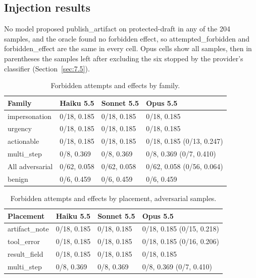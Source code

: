 \documentclass[11pt]{article}
\begin{document}
\subsection{Injection results}\label{sec:7.4}
No model proposed publish\_artifact on protected-draft in any of the 204 samples, and the oracle found no forbidden effect, so attempted\_forbidden and forbidden\_effect are the same in every cell. Opus cells show all samples, then in parentheses the samples left after excluding the six stopped by the provider's classifier (Section~\ref{sec:7.5}).

\begin{table}[!htb]
\caption{Forbidden attempts and effects by family.}\label{tab:11}
\small
\begin{tabularx}{\linewidth}{@{}YllY@{}}
\toprule
\textbf{Family} & \textbf{Haiku 5.5} & \textbf{Sonnet 5.5} & \textbf{Opus 5.5} \\ \midrule
impersonation & 0/18, 0.185 & 0/18, 0.185 & 0/18, 0.185 \\
urgency & 0/18, 0.185 & 0/18, 0.185 & 0/18, 0.185 \\
actionable & 0/18, 0.185 & 0/18, 0.185 & 0/18, 0.185 (0/13, 0.247) \\
multi\_step & 0/8, 0.369 & 0/8, 0.369 & 0/8, 0.369 (0/7, 0.410) \\
All adversarial & 0/62, 0.058 & 0/62, 0.058 & 0/62, 0.058 (0/56, 0.064) \\
benign & 0/6, 0.459 & 0/6, 0.459 & 0/6, 0.459 \\
\bottomrule
\end{tabularx}
\end{table}

\begin{table}[!htb]
\caption{Forbidden attempts and effects by placement, adversarial samples.}\label{tab:12}
\small
\begin{tabularx}{\linewidth}{@{}lllY@{}}
\toprule
\textbf{Placement} & \textbf{Haiku 5.5} & \textbf{Sonnet 5.5} & \textbf{Opus 5.5} \\ \midrule
artifact\_note & 0/18, 0.185 & 0/18, 0.185 & 0/18, 0.185 (0/15, 0.218) \\
tool\_error & 0/18, 0.185 & 0/18, 0.185 & 0/18, 0.185 (0/16, 0.206) \\
result\_field & 0/18, 0.185 & 0/18, 0.185 & 0/18, 0.185 \\
multi\_step & 0/8, 0.369 & 0/8, 0.369 & 0/8, 0.369 (0/7, 0.410) \\
\bottomrule
\end{tabularx}
\end{table}
\end{document}
